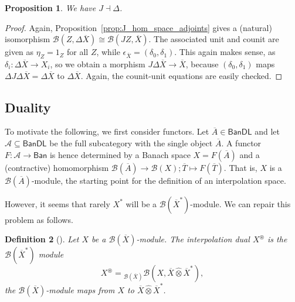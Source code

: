 \documentclass[a4paper,11pt]{article}
\theoremstyle{plain}
\newtheorem{proposition}{Proposition}[section]
\newtheorem{definition}[proposition]{Definition}
\theoremstyle{remark}
\newcommand{\mc}[1]{\mathcal{#1}}
\newcommand{\msf}[1]{\mathsf{#1}}
\newcommand{\proten}{\widehat\otimes}
\newcommand{\intdual}{\circledast}
\begin{document}
\begin{proposition}
We have $J \dashv \Delta$.
\end{proposition}
\begin{proof}
Again, Proposition~\ref{prop:J_hom_space_adjoints} gives a (natural) isomorphism $\mc B(Z, \Delta\overline X) \cong \mc B(JZ, \overline X)$.  The associated unit and counit are given as
$\eta_Z = 1_Z$ for all $Z$, while $\epsilon_{\overline X} = (\delta_0, \delta_1)$.  This again makes sense, as $\delta_i \colon \Delta\overline X \to X_i$, so we obtain a morphism $J\Delta\overline X \to \overline X$, because $(\delta_0, \delta_1)$ maps $\Delta J\Delta\overline X = \Delta\overline X$ to $\Delta\overline X$.  Again, the counit-unit equations are easily checked.
\end{proof}




\subsection{Duality}\label{sec:duality}

To motivate the following, we first consider functors.  Let $\overline A \in \msf{BanDL}$ and let $\mc A \subseteq \msf{BanDL}$ be the full subcategory with the single object $\overline A$.  A functor $F \colon \mc A \to \msf{Ban}$ is hence determined by a Banach space $X = F(\overline A)$ and a (contractive) homomorphism $\mc B(\overline A) \to \mc B(X); \overline T \mapsto F(\overline T)$.  That is, $X$ is a $\mc B(\overline A)$-module, the starting point for the definition of an interpolation space.

However, it seems that rarely $X^*$ will be a $\mc B(\overline X^*)$-module.  We can repair this problem as follows.

\begin{definition}[{\cite[Definition~IV.5.7]{KP_InterpolationFunctorsDuality}}]
Let $X$ be a $\mc B(\overline X)$-module.  The \emph{interpolation dual} $X^\intdual$ is the $\mc B(\overline X^*)$ module
\[ X^\intdual = {}_{\mc B(\overline X)}\mc B(X, \overline X \proten \overline X^*), \]
the $\mc B(\overline X)$-module maps from $X$ to $\overline X \proten \overline X^*$.
\end{definition}
\end{document}
